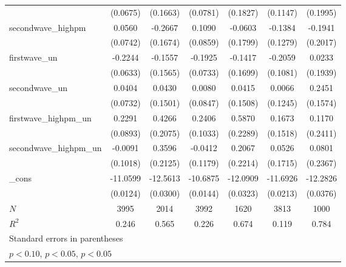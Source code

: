 \begin{table}[htbp]
\begin{tabular}{l*{6}{c}}
            &    (0.0675)         &    (0.1663)         &    (0.0781)         &    (0.1827)         &    (0.1147)         &    (0.1995)         \\
[1em]
secondwave\_highpm&      0.0560         &     -0.2667         &      0.1090         &     -0.0603         &     -0.1384         &     -0.1941         \\
            &    (0.0742)         &    (0.1674)         &    (0.0859)         &    (0.1799)         &    (0.1279)         &    (0.2017)         \\
[1em]
firstwave\_un&     -0.2244\sym{***}&     -0.1557         &     -0.1925\sym{***}&     -0.1417         &     -0.2059\sym{*}  &      0.0233         \\
            &    (0.0633)         &    (0.1565)         &    (0.0733)         &    (0.1699)         &    (0.1081)         &    (0.1939)         \\
[1em]
secondwave\_un&      0.0404         &      0.0430         &      0.0080         &      0.0415         &      0.0066         &      0.2451         \\
            &    (0.0732)         &    (0.1501)         &    (0.0847)         &    (0.1508)         &    (0.1245)         &    (0.1574)         \\
[1em]
firstwave\_highpm\_un&      0.2291\sym{***}&      0.4266\sym{***}&      0.2406\sym{***}&      0.5870\sym{***}&      0.1673         &      0.1170         \\
            &    (0.0893)         &    (0.2075)         &    (0.1033)         &    (0.2289)         &    (0.1518)         &    (0.2411)         \\
[1em]
secondwave\_highpm\_un&     -0.0091         &      0.3596\sym{*}  &     -0.0412         &      0.2067         &      0.0526         &      0.0801         \\
            &    (0.1018)         &    (0.2125)         &    (0.1179)         &    (0.2214)         &    (0.1715)         &    (0.2367)         \\
[1em]
\_cons      &    -11.0599\sym{***}&    -12.5613\sym{***}&    -10.6875\sym{***}&    -12.0909\sym{***}&    -11.6926\sym{***}&    -12.2826\sym{***}\\
            &    (0.0124)         &    (0.0300)         &    (0.0144)         &    (0.0323)         &    (0.0213)         &    (0.0376)         \\
\hline
\(N\)       &        3995         &        2014         &        3992         &        1620         &        3813         &        1000         \\
\(R^{2}\)   &       0.246         &       0.565         &       0.226         &       0.674         &       0.119         &       0.784         \\
\hline\hline
\multicolumn{7}{l}{\footnotesize Standard errors in parentheses}\\
\multicolumn{7}{l}{\footnotesize \sym{*} \(p<0.10\), \sym{**} \(p<0.05\), \sym{***} \(p<0.05\)}\\
\end{tabular}
\end{table}
